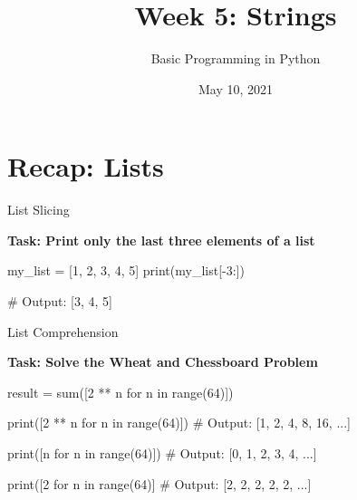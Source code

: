 



\title[Strings]{Week 5: Strings}
\subtitle{Basic Programming in Python}


\date{May 10, 2021}

\begin{frame}[plain]
    \titlepage
\end{frame}

\begin{frame}
    \tableofcontents
\end{frame}


\section{Recap: Lists}

\begin{frame}[plain]
    \sectionpage
\end{frame}

\begin{frame}[fragile]{List Slicing}

    \textbf{Task: Print only the last three elements of a list}

    \begin{pythoncode}

my_list = [1, 2, 3, 4, 5]
print(my_list[-3:])

# Output: [3, 4, 5]

    \end{pythoncode}


\end{frame}

\begin{frame}[fragile]{List Comprehension}

    \textbf{Task: Solve the Wheat and Chessboard Problem}

    \begin{pythoncode}

result = sum([2 ** n for n in range(64)])

print([2 ** n for n in range(64)])
# Output: [1, 2, 4, 8, 16, ...]

print([n for n in range(64)])
# Output: [0, 1, 2, 3, 4, ...]

print([2 for n in range(64)]
# Output: [2, 2, 2, 2, 2, ...]
    \end{pythoncode}


\end{frame}

